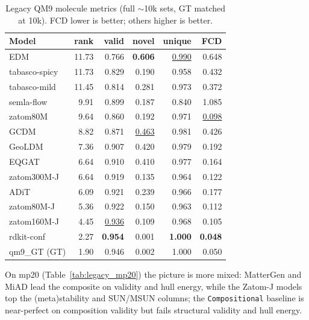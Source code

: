 \documentclass[11pt]{article}
\begin{document}
\begin{table}[H]
\centering
\small
\caption{Legacy QM9 molecule metrics (full $\sim$10k sets, GT matched at 10k). FCD lower is
better; others higher is better.}
\label{tab:legacy_qm9}
\begin{tabular}{l r r r r r}
\toprule
Model & rank & valid & novel & unique & FCD \\
\midrule
EDM           & 11.73 & 0.766 & \textbf{0.606} & \underline{0.990} & 0.648 \\
tabasco-spicy & 11.73 & 0.829 & 0.190 & 0.958 & 0.432 \\
tabasco-mild  & 11.45 & 0.814 & 0.281 & 0.973 & 0.372 \\
semla-flow    & 9.91  & 0.899 & 0.187 & 0.840 & 1.085 \\
zatom80M      & 9.64  & 0.860 & 0.192 & 0.971 & \underline{0.098} \\
GCDM          & 8.82  & 0.871 & \underline{0.463} & 0.981 & 0.426 \\
GeoLDM        & 7.36  & 0.907 & 0.420 & 0.979 & 0.192 \\
EQGAT         & 6.64  & 0.910 & 0.410 & 0.977 & 0.164 \\
zatom300M-J   & 6.64  & 0.919 & 0.135 & 0.964 & 0.122 \\
ADiT          & 6.09  & 0.921 & 0.239 & 0.966 & 0.177 \\
zatom80M-J    & 5.36  & 0.922 & 0.150 & 0.963 & 0.112 \\
zatom160M-J   & 4.45  & \underline{0.936} & 0.109 & 0.968 & 0.105 \\
rdkit-conf    & 2.27  & \textbf{0.954} & 0.001 & \textbf{1.000} & \textbf{0.048} \\
\midrule
qm9\_GT (GT)  & 1.90  & 0.946 & 0.002 & 1.000 & 0.050 \\
\bottomrule
\end{tabular}
\end{table}

On mp20 (Table~\ref{tab:legacy_mp20}) the picture is more mixed: MatterGen and MiAD lead the
composite on validity and hull energy, while the Zatom-J models top the (meta)stability and
SUN/MSUN columns; the \texttt{Compositional} baseline is near-perfect on composition validity
but fails structural validity and hull energy.
\end{document}
